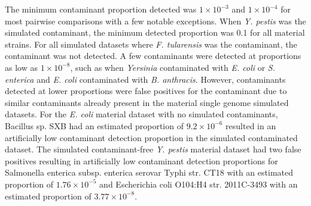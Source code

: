\documentclass[fleqn,10pt,lineno]{wlpeerj}\usepackage[]{graphicx}\usepackage[]{color}
\begin{document}


The minimum contaminant proportion detected was $1 \times 10^{-3}$ and  $1 \times 10^{-4}$ for most pairwise comparisons with a few notable exceptions. 
When \textit{Y. pestis} was the simulated contaminant, the minimum detected proportion was 0.1 for all material strains. 
For all simulated datasets where \textit{F. tularensis} was the contaminant, the contaminant was not detected.
A few contaminants were detected at proportions as low as $1 \times 10^{-8}$, such as when \textit{Yersinia} contaminated with \textit{E. coli} or \textit{S. enterica} and \textit{E. coli} contaminated with \textit{B. anthracis}. 
However, contaminants detected at lower proportions were false positives for the contaminant due to similar contaminants already present in the material single genome simulated datasets. 
For the \textit{E. coli} material dataset with no simulated contaminants, Bacillus sp. SXB had an estimated proportion of \ensuremath{9.2\times 10^{-6}} resulted in an artificially low contaminant detection proportion in the simulated contaminated dataset. 
The simulated contaminant-free \textit{Y. pestis} material dataset had two false positives resulting in artificially low contaminant detection proportions for Salmonella enterica subsp. enterica serovar Typhi str. CT18 with an estimated proportion of \ensuremath{1.76\times 10^{-5}} and Escherichia coli O104:H4 str. 2011C-3493 with an estimated proportion of \ensuremath{3.77\times 10^{-8}}.
\end{document}
